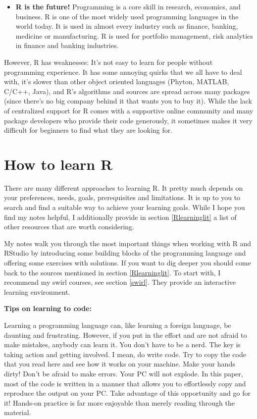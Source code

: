 \documentclass[
  12pt,
  oneside]{book}
\theoremstyle{definition}
\theoremstyle{definition}
\theoremstyle{definition}
\theoremstyle{definition}
\theoremstyle{remark}
\begin{document}
\begin{itemize}
\item
  \textbf{R is the future!} Programming is a core skill in research, economics, and business. R is one of the most widely used programming languages in the world today. It is used in almost every industry such as finance, banking, medicine or manufacturing. R is used for portfolio management, risk analytics in finance and banking industries.
\end{itemize}

However, R has weaknesses: It's not easy to learn for people without programming experience. It has some annoying quirks that we all have to deal with, it's slower than other object oriented languages (Phyton, MATLAB, C/C++, Java), and R's algorithms and sources are spread across many packages (since there's no big company behind it that wants you to buy it). While the lack of centralized support for R comes with a supportive online community and many package developers who provide their code generously, it sometimes makes it very difficult for beginners to find what they are looking for.

\hypertarget{howtolearnr}{%
\section{How to learn R}\label{howtolearnr}}

There are many different approaches to learning R. It pretty much depends on your preferences, needs, goals, prerequisites and limitations. It is up to you to search and find a suitable way to achieve your learning goals. While I hope you find my notes helpful, I additionally provide in section \ref{Rlearninglit} a list of other resources that are worth considering.

My notes walk you through the most important things when working with R and RStudio by introducing some building blocks of the programming language and offering some exercises with solutions. If you want to dig deeper you should come back to the sources mentioned in section \ref{Rlearninglit}. To start with, I recommend my swirl courses, see section \ref{swirl}. They provide an interactive learning environment.

\textbf{Tips on learning to code:}

Learning a programming language can, like learning a foreign language, be daunting and frustrating. However, if you put in the effort and are not afraid to make mistakes, anybody can learn it. You don't have to be a nerd. The key is taking action and getting involved. I mean, do write code. Try to copy the code that you read here and see how it works on your machine. Make your hands dirty! Don't be afraid to make errors. Your PC will not explode.
In this paper, most of the code is written in a manner that allows you to effortlessly copy and reproduce the output on your PC. Take advantage of this opportunity and go for it! Hands-on practice is far more enjoyable than merely reading through the material.
\end{document}
